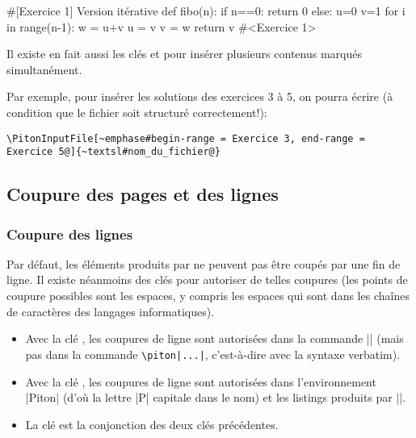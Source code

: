 \documentclass[dvipsnames,svgnames]{article}
\begin{document}
\begin{Piton}
#[Exercice 1] Version itérative
def fibo(n):
    if n==0: return 0 
    else:
        u=0
        v=1
        for i in range(n-1):
            w = u+v
            u = v
            v = w
        return v
#<Exercice 1>
\end{Piton}


\bigskip
{}  Il existe en fait aussi les clés
 et  pour insérer plusieurs contenus marqués
simultanément.

Par exemple, pour insérer les solutions des exercices 3 à 5, on pourra écrire (à condition
que le fichier soit structuré correctement!):

\begin{Verbatim}
\PitonInputFile[~emphase#begin-range = Exercice 3, end-range = Exercice 5@]{~textsl#nom_du_fichier@}
\end{Verbatim}




\subsection{Coupure des pages et des lignes}

\label{breakable}

\subsubsection{Coupure des lignes}

\label{line-breaks}

Par défaut, les éléments produits par  ne peuvent pas être coupés par une fin
de ligne. Il existe néanmoins des clés pour autoriser de telles coupures (les points de
coupure possibles sont les espaces, y compris les espaces qui sont dans les chaînes de
caractères des langages informatiques).
\begin{itemize}
\item {} Avec la clé
, les coupures de ligne sont autorisées dans la commande
|| (mais pas dans la commande \verb+\piton|...|+, c'est-à-dire avec la syntaxe
verbatim).

\item {} Avec la clé
, les coupures de ligne sont autorisées dans
l'environnement |{Piton}| (d'où la lettre |P| capitale dans le nom) et les listings
produits par |\PitonInputFile|.

\item {} La clé  est la conjonction des deux clés
précédentes.
\end{itemize}
\end{document}
